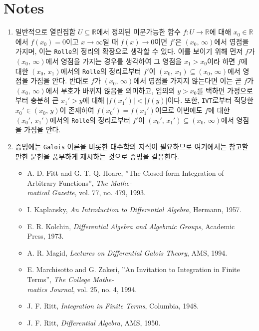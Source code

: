 \section*{Notes}
\footnotesize
\begin{enumerate}[label = \textsf{\textbf{\arabic*}}]
    \item 일반적으로 열린집합 $U\subseteq\mathbb{R}$에서 정의된 미분가능한 함수 $f:U\to\mathbb{R}$에 대해 $x_0\in\mathbb{R}$에서 $f(x_0)=0$이고 $x\to\infty$일 때 $f(x)\to0$이면 $f'$은 $(x_0,\,\infty)$에서 영점을 가지며, 이는 \texttt{Rolle}의 정리의 확장으로 생각할 수 있다. 이를 보이기 위해 먼저 $f$가 $(x_0,\,\infty)$에서 영점을 가지는 경우를 생각하여 그 영점을 $x_1>x_0$이라 하면 $f$에 대한 $(x_0,\,x_1)$에서의 \texttt{Rolle}의 정리로부터 $f'$이 $(x_0,\,x_1)\subseteq(x_0,\,\infty)$에서 영점을 가짐을 안다. 반대로 $f$가 $(x_0,\,\infty)$에서 영점을 가지지 않는다면 이는 곧 $f$가 $(x_0,\,\infty)$에서 부호가 바뀌지 않음을 의미하고, 임의의 $y>x_0$를 택하면 가정으로부터 충분히 큰 $x_1'>y$에 대해 $|f(x_1')|<|f(y)|$이다. 또한, \texttt{IVT}로부터 적당한 $x_0'\in(x_0,\,y)$이 존재하여 $f(x_0')=f(x_1')$이므로 이번에도 $f$에 대한 $(x_0',\,x_1')$에서의 \texttt{Rolle}의 정리로부터 $f'$이 $(x_0',\,x_1')\subseteq(x_0,\,\infty)$에서 영점을 가짐을 안다.
    \item 증명에는 \texttt{Galois} 이론을 비롯한 대수학의 지식이 필요하므로 여기에서는 참고할 만한 문헌을 풍부하게 제시하는 것으로 증명을 갈음한다.
    \begin{itemize}
        \ttfamily
        \item A. D. Fitt and G. T. Q. Hoare, ''The Closed-form Integration of Arbitrary Functions'', \textit{The Mathe-\\matical Gazette}, vol. 77, no. 479, 1993.
        \item I. Kaplansky, \textit{An Introduction to Differential Algebra}, Hermann, 1957.
        \item E. R. Kolchin, \textit{Differential Algebra and Algebraic Groups}, Academic Press, 1973.
        \item A. R. Magid, \textit{Lectures on Differential Galois Theory}, AMS, 1994.
        \item E. Marchisotto and G. Zakeri, ''An Invitation to Integration in Finite Terms'', \textit{The College Mathe-\\matics Journal}, vol. 25, no. 4, 1994.
        \item J. F. Ritt, \textit{Integration in Finite Terms}, Columbia, 1948.
        \item J. F. Ritt, \textit{Differential Algebra}, AMS, 1950.

\end{itemize}
\end{enumerate}
